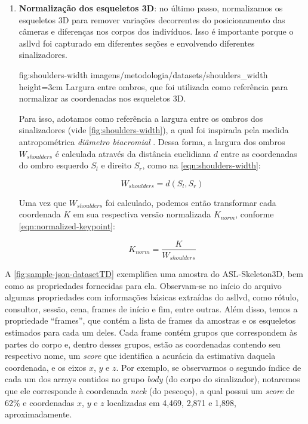 \begin{enumerate}
    \item \textbf{Normalização dos esqueletos 3D}: no último passo, normalizamos os esqueletos 3D para remover variações decorrentes do posicionamento das câmeras e diferenças nos corpos dos indivíduos. Isso é importante porque o \acrshort{asllvd} foi capturado em diferentes seções e envolvendo diferentes sinalizadores.

          \figura
          {fig:shoulders-width} %
          {imagens/metodologia/datasets/shoulders_width} %
          {height=3cm} %
          {Largura entre ombros, que foi utilizada como referência para normalizar as coordenadas nos esqueletos 3D.} %
          {} %

          Para isso, adotamos como referência a largura entre os ombros dos sinalizadores (vide \autoref{fig:shoulders-width}), a qual foi inspirada pela medida antropométrica \textit{diâmetro biacromial} \cite{stoudt-1970-skinfolds}. Dessa forma, a largura dos ombros \(W_{shoulders}\) é calculada através da distância euclidiana \(d\) \cite{anton-2013-algebra} entre as coordenadas do ombro esquerdo \(S_{l}\) e direito \(S_ {r}\), como na \autoref{eqn:shoulders-width}:

          \begin{equation}
              \label{eqn:shoulders-width}
              W_{shoulders} = d\left(S_{l}, S_{r}\right)
          \end{equation}

          Uma vez que \(W_{shoulders}\) foi calculado, podemos então transformar cada coordenada \(K\) em sua respectiva versão normalizada \(K_{norm}\), conforme \autoref{eqn:normalized-keypoint}:

          \begin{equation}
              \label{eqn:normalized-keypoint}
              K_{norm} = \frac{K}{W_{shoulders}}
          \end{equation}

\end{enumerate}


A \autoref{fig:sample-json-datasetTD} exemplifica uma amostra do ASL-Skeleton3D, bem como as propriedades fornecidas para ela. Observam-se no início do arquivo algumas propriedades com informações básicas extraídas do \acrshort{asllvd}, como rótulo, consultor, sessão, cena, frames de início e fim, entre outras. Além disso, temos a propriedade ``frames'', que contém a lista de frames da amostras e os esqueletos estimados para cada um deles. Cada frame contém grupos que correspondem às partes do corpo e, dentro desses grupos, estão as coordenadas contendo seu respectivo nome, um \textit{score} que identifica a acurácia da estimativa daquela coordenada, e os eixos \(x\), \(y\) e \(z\).
Por exemplo, se observarmos o segundo índice de cada um dos arrays contidos no grupo \textit{body} (do corpo do sinalizador), notaremos que ele corresponde à coordenada \textit{neck} (do pescoço), a qual possui um \textit{score} de 62\% e coordenadas \(x\), \(y\) e \(z\) localizadas em 4,469, 2,871 e 1,898, aproximadamente.

